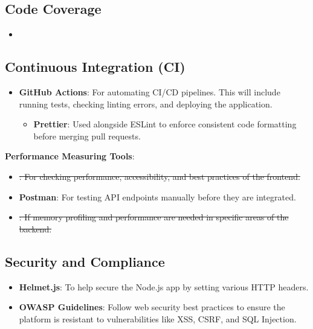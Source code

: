 \documentclass{article}
\begin{document}
\subsection{Code Coverage}
\begin{itemize}
  \item \sout{} \emph{\color{red}{(Caption: Removed due to scope reduction)}}
\end{itemize}

\subsection{Continuous Integration (CI)}
\begin{itemize}
  \item \textbf{GitHub Actions}: For automating CI/CD pipelines. This will include running tests, checking linting errors, and deploying the application.
  \begin{itemize}
    \item \textbf{Prettier}: Used alongside ESLint to enforce consistent code formatting before merging pull requests.
  \end{itemize}
\end{itemize}

\textbf{Performance Measuring Tools}:
\begin{itemize}
  \item \sout{: For checking performance, accessibility, and best practices of the frontend.}\emph{\color{red}{(Caption: Removed redundant tool)}}
  \item \textbf{Postman}: For testing API endpoints manually before they are integrated.
  \item \sout{: If memory profiling and performance are needed in specific areas of the backend.}\emph{\color{red}{(Caption: Removed as unnecessary for current phase)}}
\end{itemize}

\subsection{Security and Compliance}
\begin{itemize}
  \item \textbf{Helmet.js}: To help secure the Node.js app by setting various HTTP headers.
  \item \textbf{OWASP Guidelines}: Follow web security best practices to ensure the platform is resistant to vulnerabilities like XSS, CSRF, and SQL Injection.
\end{itemize}
\end{document}
